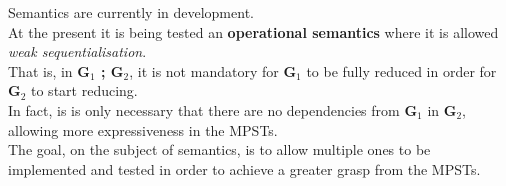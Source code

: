 \normalsize
Semantics are currently in development.\\
At the present it is being tested an \textbf{operational semantics} where it is allowed \textit{weak sequentialisation}.\cite{Edixhoven-branching-2023}\\
That is, in \textbf{G$_1$ ; G$_2$}, it is not mandatory for \textbf{G$_1$} to be fully reduced in order for \textbf{G$_2$} to start reducing.\\
In fact, is is only necessary that there are no dependencies from \textbf{G$_1$} in \textbf{G$_2$}, allowing more expressiveness in the MPSTs.\\
The goal, on the subject of semantics, is to allow multiple ones to be implemented and tested in order to achieve a greater grasp from the MPSTs.